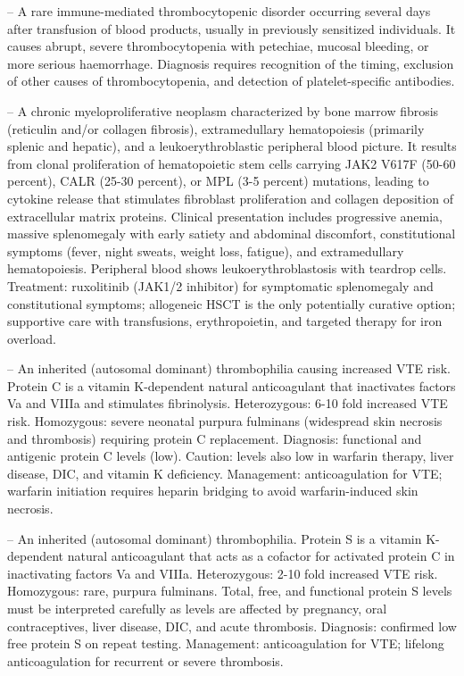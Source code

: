 -- A rare immune-mediated thrombocytopenic disorder occurring several days after transfusion of blood products, usually in previously sensitized individuals. It causes abrupt, severe thrombocytopenia with petechiae, mucosal bleeding, or more serious haemorrhage. Diagnosis requires recognition of the timing, exclusion of other causes of thrombocytopenia, and detection of platelet-specific antibodies.

-- A chronic myeloproliferative neoplasm characterized by bone marrow fibrosis (reticulin and/or collagen fibrosis), extramedullary hematopoiesis (primarily splenic and hepatic), and a leukoerythroblastic peripheral blood picture. It results from clonal proliferation of hematopoietic stem cells carrying JAK2 V617F (50-60 percent), CALR (25-30 percent), or MPL (3-5 percent) mutations, leading to cytokine release that stimulates fibroblast proliferation and collagen deposition of extracellular matrix proteins. Clinical presentation includes progressive anemia, massive splenomegaly with early satiety and abdominal discomfort, constitutional symptoms (fever, night sweats, weight loss, fatigue), and extramedullary hematopoiesis. Peripheral blood shows leukoerythroblastosis with teardrop cells. Treatment: ruxolitinib (JAK1/2 inhibitor) for symptomatic splenomegaly and constitutional symptoms; allogeneic HSCT is the only potentially curative option; supportive care with transfusions, erythropoietin, and targeted therapy for iron overload.

-- An inherited (autosomal dominant) thrombophilia causing increased VTE risk. Protein C is a vitamin K-dependent natural anticoagulant that inactivates factors Va and VIIIa and stimulates fibrinolysis. Heterozygous: 6-10 fold increased VTE risk. Homozygous: severe neonatal purpura fulminans (widespread skin necrosis and thrombosis) requiring protein C replacement. Diagnosis: functional and antigenic protein C levels (low). Caution: levels also low in warfarin therapy, liver disease, DIC, and vitamin K deficiency. Management: anticoagulation for VTE; warfarin initiation requires heparin bridging to avoid warfarin-induced skin necrosis.

-- An inherited (autosomal dominant) thrombophilia. Protein S is a vitamin K-dependent natural anticoagulant that acts as a cofactor for activated protein C in inactivating factors Va and VIIIa. Heterozygous: 2-10 fold increased VTE risk. Homozygous: rare, purpura fulminans. Total, free, and functional protein S levels must be interpreted carefully as levels are affected by pregnancy, oral contraceptives, liver disease, DIC, and acute thrombosis. Diagnosis: confirmed low free protein S on repeat testing. Management: anticoagulation for VTE; lifelong anticoagulation for recurrent or severe thrombosis.

